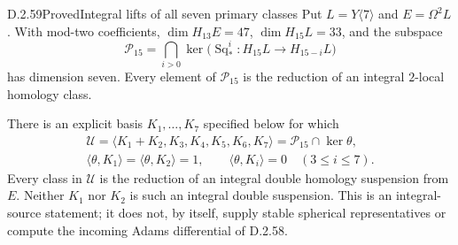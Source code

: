 \begin{claim}{D.2.59}{Proved}{Integral lifts of all seven primary classes}
Put $L=Y\langle7\rangle$ and $E=\Omega^2L$.  With mod-two
coefficients, $\dim H_{13}E=47$, $\dim H_{15}L=33$, and the
subspace
\[
 \mathcal P_{15}=\bigcap_{i>0}\ker\bigl(
      \operatorname{Sq}_*^i:H_{15}L\longrightarrow H_{15-i}L\bigr)
 \tag{D.2.59a}
\]
has dimension seven.  Every element of $\mathcal P_{15}$ is the
reduction of an integral $2$-local homology class.

There is an explicit basis $K_1,\ldots,K_7$ specified below for which
\[
 \begin{gathered}
 \mathcal U=\langle K_1+K_2,K_3,K_4,K_5,K_6,K_7\rangle
   =\mathcal P_{15}\cap\ker\theta,\\
 \langle\theta,K_1\rangle=\langle\theta,K_2\rangle=1,
 \qquad \langle\theta,K_i\rangle=0\quad(3\leq i\leq7).
 \end{gathered}
 \tag{D.2.59b}
\]
Every class in $\mathcal U$ is the reduction of an integral double
homology suspension from $E$.  Neither $K_1$ nor $K_2$ is such an
integral double suspension.  This is an integral-source statement;
it does not, by itself, supply stable spherical representatives
or compute the incoming Adams differential of D.2.58.
\end{claim}
